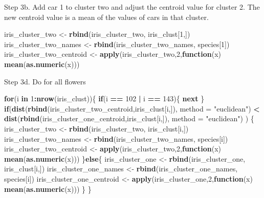 \documentclass[11pt,]{article}
\newenvironment{Shaded}{\begin{snugshade}}{\end{snugshade}}
\newcommand{\ControlFlowTok}[1]{\textcolor[rgb]{0.13,0.29,0.53}{\textbf{#1}}}
\newcommand{\DataTypeTok}[1]{\textcolor[rgb]{0.13,0.29,0.53}{#1}}
\newcommand{\DecValTok}[1]{\textcolor[rgb]{0.00,0.00,0.81}{#1}}
\newcommand{\KeywordTok}[1]{\textcolor[rgb]{0.13,0.29,0.53}{\textbf{#1}}}
\newcommand{\NormalTok}[1]{#1}
\newcommand{\OperatorTok}[1]{\textcolor[rgb]{0.81,0.36,0.00}{\textbf{#1}}}
\newcommand{\StringTok}[1]{\textcolor[rgb]{0.31,0.60,0.02}{#1}}
\begin{document}
Step 3b. Add car 1 to cluster two and adjust the centroid value for
cluster 2. The new centroid value is a mean of the values of cars in
that cluster.

\begin{Shaded}
\begin{Highlighting}[]
\NormalTok{iris_cluster_two <-}\StringTok{ }\KeywordTok{rbind}\NormalTok{(iris_cluster_two, iris_clust[}\DecValTok{1}\NormalTok{,])}
\NormalTok{iris_cluster_two_names <-}\StringTok{ }\KeywordTok{rbind}\NormalTok{(iris_cluster_two_names, species[}\DecValTok{1}\NormalTok{])}
\NormalTok{iris_cluster_two_centroid <-}\StringTok{ }\KeywordTok{apply}\NormalTok{(iris_cluster_two,}\DecValTok{2}\NormalTok{,}\ControlFlowTok{function}\NormalTok{(x) }\KeywordTok{mean}\NormalTok{(}\KeywordTok{as.numeric}\NormalTok{(x)))}
\end{Highlighting}
\end{Shaded}

Step 3d. Do for all flowers

\begin{Shaded}
\begin{Highlighting}[]
\ControlFlowTok{for}\NormalTok{(i }\ControlFlowTok{in} \DecValTok{1}\OperatorTok{:}\KeywordTok{nrow}\NormalTok{(iris_clust))\{}
  \ControlFlowTok{if}\NormalTok{(i }\OperatorTok{==}\StringTok{ }\DecValTok{102} \OperatorTok{|}\StringTok{ }\NormalTok{i }\OperatorTok{==}\StringTok{ }\DecValTok{143}\NormalTok{)\{}
    \ControlFlowTok{next}
\NormalTok{  \}}
  \ControlFlowTok{if}\NormalTok{(}\KeywordTok{dist}\NormalTok{(}\KeywordTok{rbind}\NormalTok{(iris_cluster_two_centroid,iris_clust[i,]), }\DataTypeTok{method =} \StringTok{"euclidean"}\NormalTok{) }\OperatorTok{<}\StringTok{ }\KeywordTok{dist}\NormalTok{(}\KeywordTok{rbind}\NormalTok{(iris_cluster_one_centroid,iris_clust[i,]), }\DataTypeTok{method =} \StringTok{"euclidean"}\NormalTok{) ) \{}
\NormalTok{    iris_cluster_two <-}\StringTok{ }\KeywordTok{rbind}\NormalTok{(iris_cluster_two, iris_clust[i,])}
\NormalTok{    iris_cluster_two_names <-}\StringTok{ }\KeywordTok{rbind}\NormalTok{(iris_cluster_two_names, species[i])}
\NormalTok{    iris_cluster_two_centroid <-}\StringTok{ }\KeywordTok{apply}\NormalTok{(iris_cluster_two,}\DecValTok{2}\NormalTok{,}\ControlFlowTok{function}\NormalTok{(x) }\KeywordTok{mean}\NormalTok{(}\KeywordTok{as.numeric}\NormalTok{(x)))}
\NormalTok{  \}}\ControlFlowTok{else}\NormalTok{\{}
\NormalTok{    iris_cluster_one <-}\StringTok{ }\KeywordTok{rbind}\NormalTok{(iris_cluster_one, iris_clust[i,])}
\NormalTok{    iris_cluster_one_names <-}\StringTok{ }\KeywordTok{rbind}\NormalTok{(iris_cluster_one_names, species[i])}
\NormalTok{    iris_cluster_one_centroid <-}\StringTok{ }\KeywordTok{apply}\NormalTok{(iris_cluster_one,}\DecValTok{2}\NormalTok{,}\ControlFlowTok{function}\NormalTok{(x) }\KeywordTok{mean}\NormalTok{(}\KeywordTok{as.numeric}\NormalTok{(x)))}
\NormalTok{  \}}
\NormalTok{\}}
\end{Highlighting}
\end{Shaded}
\end{document}
